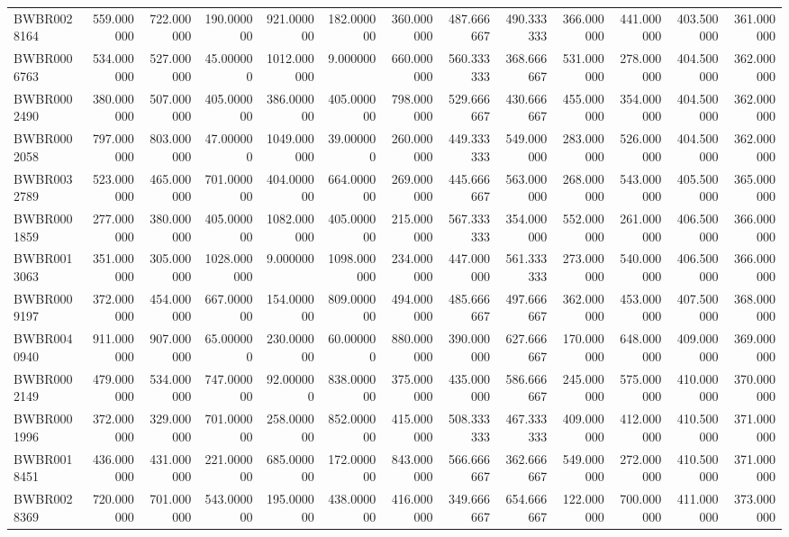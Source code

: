 \begin{longtable}{lrrrrrrrrrrrr}
BWBR0028164 & 559.000000 & 722.000000 & 190.000000 & 921.000000 & 182.000000 & 360.000000 & 487.666667 & 490.333333 & 366.000000 & 441.000000 & 403.500000 & 361.000000 \\
BWBR0006763 & 534.000000 & 527.000000 & 45.000000 & 1012.000000 & 9.000000 & 660.000000 & 560.333333 & 368.666667 & 531.000000 & 278.000000 & 404.500000 & 362.000000 \\
BWBR0002490 & 380.000000 & 507.000000 & 405.000000 & 386.000000 & 405.000000 & 798.000000 & 529.666667 & 430.666667 & 455.000000 & 354.000000 & 404.500000 & 362.000000 \\
BWBR0002058 & 797.000000 & 803.000000 & 47.000000 & 1049.000000 & 39.000000 & 260.000000 & 449.333333 & 549.000000 & 283.000000 & 526.000000 & 404.500000 & 362.000000 \\
BWBR0032789 & 523.000000 & 465.000000 & 701.000000 & 404.000000 & 664.000000 & 269.000000 & 445.666667 & 563.000000 & 268.000000 & 543.000000 & 405.500000 & 365.000000 \\
BWBR0001859 & 277.000000 & 380.000000 & 405.000000 & 1082.000000 & 405.000000 & 215.000000 & 567.333333 & 354.000000 & 552.000000 & 261.000000 & 406.500000 & 366.000000 \\
BWBR0013063 & 351.000000 & 305.000000 & 1028.000000 & 9.000000 & 1098.000000 & 234.000000 & 447.000000 & 561.333333 & 273.000000 & 540.000000 & 406.500000 & 366.000000 \\
BWBR0009197 & 372.000000 & 454.000000 & 667.000000 & 154.000000 & 809.000000 & 494.000000 & 485.666667 & 497.666667 & 362.000000 & 453.000000 & 407.500000 & 368.000000 \\
BWBR0040940 & 911.000000 & 907.000000 & 65.000000 & 230.000000 & 60.000000 & 880.000000 & 390.000000 & 627.666667 & 170.000000 & 648.000000 & 409.000000 & 369.000000 \\
BWBR0002149 & 479.000000 & 534.000000 & 747.000000 & 92.000000 & 838.000000 & 375.000000 & 435.000000 & 586.666667 & 245.000000 & 575.000000 & 410.000000 & 370.000000 \\
BWBR0001996 & 372.000000 & 329.000000 & 701.000000 & 258.000000 & 852.000000 & 415.000000 & 508.333333 & 467.333333 & 409.000000 & 412.000000 & 410.500000 & 371.000000 \\
BWBR0018451 & 436.000000 & 431.000000 & 221.000000 & 685.000000 & 172.000000 & 843.000000 & 566.666667 & 362.666667 & 549.000000 & 272.000000 & 410.500000 & 371.000000 \\
BWBR0028369 & 720.000000 & 701.000000 & 543.000000 & 195.000000 & 438.000000 & 416.000000 & 349.666667 & 654.666667 & 122.000000 & 700.000000 & 411.000000 & 373.000000 \\

\end{longtable}
